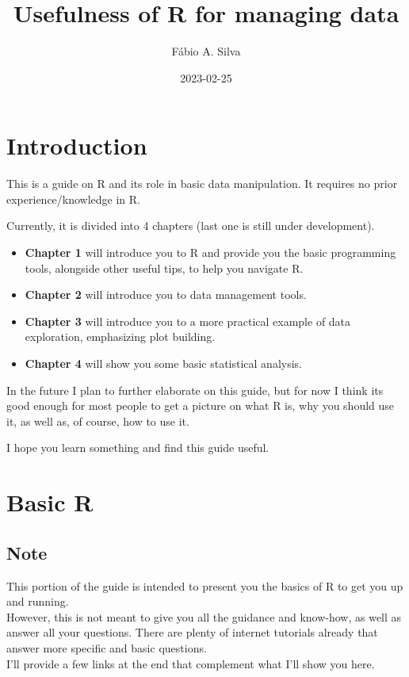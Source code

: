 \documentclass[
]{book}
\title{Usefulness of R for managing data}
\author{Fábio A. Silva}
\date{2023-02-25}
\begin{document}
\maketitle

{
\setcounter{tocdepth}{1}
\tableofcontents
}
\hypertarget{introduction}{%
\chapter{Introduction}\label{introduction}}

This is a guide on R and its role in basic data manipulation.
It requires no prior experience/knowledge in R.

Currently, it is divided into 4 chapters (last one is still under development).

\begin{itemize}
\item
  \textbf{Chapter 1} will introduce you to R and provide you the basic programming tools, alongside other useful tips, to help you navigate R.
\item
  \textbf{Chapter 2} will introduce you to data management tools.
\item
  \textbf{Chapter 3} will introduce you to a more practical example of data exploration, emphasizing plot building.
\item
  \textbf{Chapter 4} will show you some basic statistical analysis.
\end{itemize}

In the future I plan to further elaborate on this guide, but for now I think its good enough for most people to get a picture on what R is, why you should use it, as well as, of course, how to use it.

I hope you learn something and find this guide useful.

\hypertarget{basic-r}{%
\chapter{Basic R}\label{basic-r}}

\hypertarget{note}{%
\section{Note}\label{note}}

This portion of the guide is intended to present you the basics of R to get you up and running.\\
However, this is not meant to give you all the guidance and know-how, as well as answer all your questions.
There are plenty of internet tutorials already that answer more specific and basic questions.\\
I'll provide a few links at the end that complement what I'll show you here.
\end{document}
